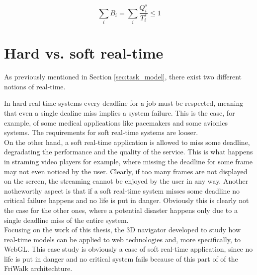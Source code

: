 \begin{equation} \label{eq:temporal_isolation}
    \displaystyle\sum_{i} B_{i} =  \displaystyle\sum_{i} \frac{Q_{i}^s}{T_{i}^s} \leq 1
\end{equation}


\section{Hard vs. soft real-time}
As previously mentioned in Section \ref{sec:task_model}, there exist two different
notions of real-time.

In hard real-time systems every deadline for a job must be respected, meaning
that even a single dealine miss implies a system failure. This is the case, for
example, of some medical applications like pacemakers and some avionics systems.
The requirements for soft real-time systems are looser.\\
On the other hand, a soft real-time application is allowed to miss some deadline,
degradating the performance and the quality of the service.
This is what happens in straming video players for example, where missing the
deadline for some frame may not even noticed by the user. Clearly, if too many
frames are not displayed on the screen, the streaming cannot be enjoyed by the
user in any way. Another notheworthy aspect is that if a soft real-time system
misses some deadline no critical failure happens and no life is put in danger.
Obviously this is clearly not the case for the other ones, where a potential
disaster happens only due to a single deadline miss of the entire system.\\
Focusing on the work of this thesis, the 3D navigator developed to study how
real-time models can be applied to web technologies and, more specifically, to
WebGL. This case study is obviously a case of soft real-time application, since
no life is put in danger and no critical system fails because of this part of
of the FriWalk architechture.
